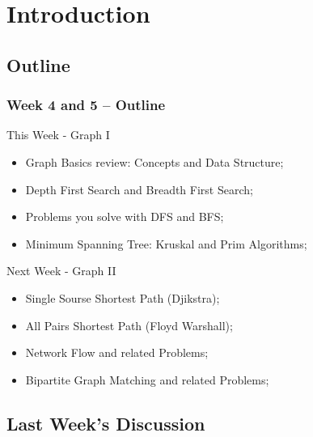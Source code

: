 \section{Introduction}
\subsection{Outline}

\begin{frame}
  \frametitle{Week 4 and 5 -- Outline}
  {\smaller
  \begin{block}{This Week - Graph I}
    \begin{itemize}
    \item Graph Basics review: Concepts and Data Structure;
    \item Depth First Search and Breadth First Search;
    \item Problems you solve with DFS and BFS;
    \item Minimum Spanning Tree: Kruskal and Prim Algorithms;
    \end{itemize}
  \end{block}
  \begin{block}{Next Week - Graph II}
    \begin{itemize}
    \item Single Sourse Shortest Path (Djikstra);
    \item All Pairs Shortest Path (Floyd Warshall);
    \item Network Flow and related Problems;
    \item Bipartite Graph Matching and related Problems;
    \end{itemize}
  \end{block}}
\end{frame}


\subsection{Last Week's Discussion}
